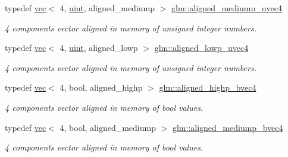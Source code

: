 \begin{DoxyCompactItemize}
typedef \hyperlink{structglm_1_1vec}{vec}$<$ 4, \hyperlink{group__core__precision_ga4fd29415871152bfb5abd588334147c8}{uint}, aligned\+\_\+mediump $>$ \hyperlink{group__gtc__type__aligned_gace9017071502bcfcd099532706881836}{glm\+::aligned\+\_\+mediump\+\_\+uvec4}
\begin{DoxyCompactList}\small\item\em 4 components vector aligned in memory of unsigned integer numbers. \end{DoxyCompactList}\item 
\mbox{\label{group__gtc__type__aligned_ga4d1ee133cfc4f795052958ffab70d746}} 
typedef \hyperlink{structglm_1_1vec}{vec}$<$ 4, \hyperlink{group__core__precision_ga4fd29415871152bfb5abd588334147c8}{uint}, aligned\+\_\+lowp $>$ \hyperlink{group__gtc__type__aligned_ga4d1ee133cfc4f795052958ffab70d746}{glm\+::aligned\+\_\+lowp\+\_\+uvec4}
\begin{DoxyCompactList}\small\item\em 4 components vector aligned in memory of unsigned integer numbers. \end{DoxyCompactList}\item 
\mbox{\label{group__gtc__type__aligned_ga833e4cd7402677f8ca56795a12d8bec0}} 
typedef \hyperlink{structglm_1_1vec}{vec}$<$ 4, bool, aligned\+\_\+highp $>$ \hyperlink{group__gtc__type__aligned_ga833e4cd7402677f8ca56795a12d8bec0}{glm\+::aligned\+\_\+highp\+\_\+bvec4}
\begin{DoxyCompactList}\small\item\em 4 components vector aligned in memory of bool values. \end{DoxyCompactList}\item 
\mbox{\label{group__gtc__type__aligned_gaa5fba8713e0381efe85996169fbc2bcc}} 
typedef \hyperlink{structglm_1_1vec}{vec}$<$ 4, bool, aligned\+\_\+mediump $>$ \hyperlink{group__gtc__type__aligned_gaa5fba8713e0381efe85996169fbc2bcc}{glm\+::aligned\+\_\+mediump\+\_\+bvec4}
\begin{DoxyCompactList}\small\item\em 4 components vector aligned in memory of bool values. \end{DoxyCompactList}\item 
\mbox{\label{group__gtc__type__aligned_ga7584318e96ebbf1e7649a7af7724ecca}} 

\end{DoxyCompactItemize}
